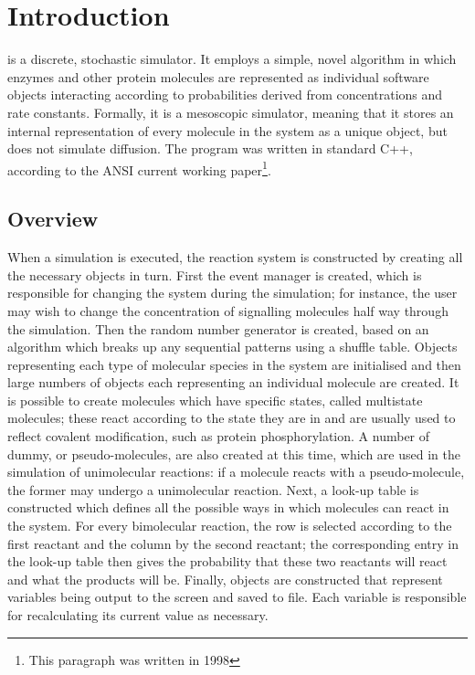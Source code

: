 \chapter{Introduction}
\stochsim{} is a discrete, stochastic simulator. It employs a simple,
novel algorithm in which enzymes and other protein molecules are
represented as individual software objects interacting according to
probabilities derived from concentrations and rate constants.
Formally, it is a mesoscopic simulator, meaning that it stores an
internal representation of every molecule in the system as a unique
object, but does not simulate diffusion.  The program was written in
standard C++, according to the ANSI current working
paper\footnote{This paragraph was written in 1998}.

\section{Overview}
When a simulation is executed, the reaction system is constructed by
creating all the necessary objects in turn. First the event manager is
created, which is responsible for changing the system during the
simulation; for instance, the user may wish to change the
concentration of signalling molecules half way through the simulation.
Then the random number generator is created, based on an algorithm
which breaks up any sequential patterns using a shuffle table. Objects
representing each type of molecular species in the system are
initialised and then large numbers of objects each representing an
individual molecule are created. It is possible to create molecules
which have specific states, called multistate molecules; these react
according to the state they are in and are usually used to reflect
covalent modification, such as protein phosphorylation. A number of
dummy, or pseudo-molecules, are also created at this time, which are
used in the simulation of unimolecular reactions: if a molecule reacts
with a pseudo-molecule, the former may undergo a unimolecular
reaction. Next, a look-up table is constructed which defines all the
possible ways in which molecules can react in the system. For every
bimolecular reaction, the row is selected according to the first
reactant and the column by the second reactant; the corresponding
entry in the look-up table then gives the probability that these two
reactants will react and what the products will be. Finally, objects
are constructed that represent variables being output to the screen
and saved to file. Each variable is responsible for recalculating its
current value as necessary.

